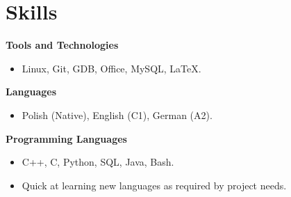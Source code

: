 \renewcommand{\subsection}[1]{
    \noindent\textbf{#1}
}

\section{Skills}

\vspace{-2em}

\begin{multicols}{2}

\subsection{Tools and Technologies}{}{}
\begin{itemize}
    \item Linux, Git, GDB, Office, MySQL, LaTeX.
\end{itemize}

\subsection{Languages}{}{}
\begin{itemize}
    \item Polish (Native), English (C1), German (A2).
\end{itemize}

\subsection{Programming Languages}{}{}
\begin{itemize}
    \item C++, C, Python, SQL, Java, Bash.
    \item Quick at learning new languages as required by project needs.
\end{itemize}

\end{multicols}
